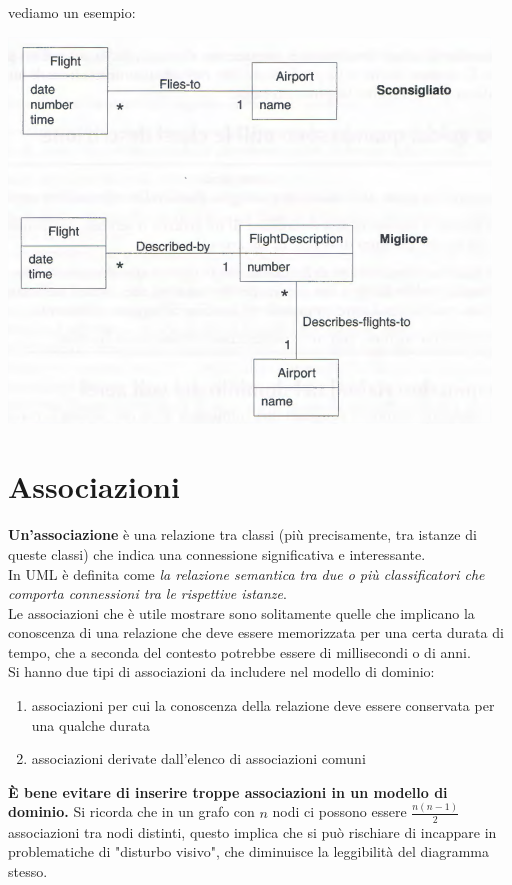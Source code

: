 \documentclass[a4paper,12pt, oneside]{book}
\begin{document}
\newpage
vediamo un esempio:
\begin{center}
	\includegraphics[scale=0.7]{img/carad.png}
\end{center}
\section{Associazioni}
\textbf{Un'associazione} è una relazione tra classi (più precisamente, tra istanze di queste classi)
che indica una connessione significativa e interessante.\\
In UML è definita come \textit{la relazione semantica tra due o più classificatori che comporta connessioni tra le rispettive istanze}.\\
Le associazioni che è utile mostrare sono solitamente quelle che implicano la conoscenza di una relazione che deve essere memorizzata per una certa durata di tempo, che a seconda del contesto potrebbe essere di millisecondi o di anni.\\ Si hanno due tipi di associazioni da includere nel modello di dominio:
\begin{enumerate}
	\item associazioni per cui la conoscenza della relazione deve essere conservata per una qualche durata
	\item associazioni derivate dall'elenco di associazioni comuni
\end{enumerate}
\textbf{È bene evitare di inserire troppe associazioni in un modello di dominio.} Si ricorda che in un grafo con $n$ nodi ci possono essere $\frac{n(n-1)}{2}$ associazioni tra nodi distinti, questo implica che si può rischiare di incappare in problematiche di "disturbo visivo", che diminuisce la leggibilità del diagramma stesso.\\
\end{document}
